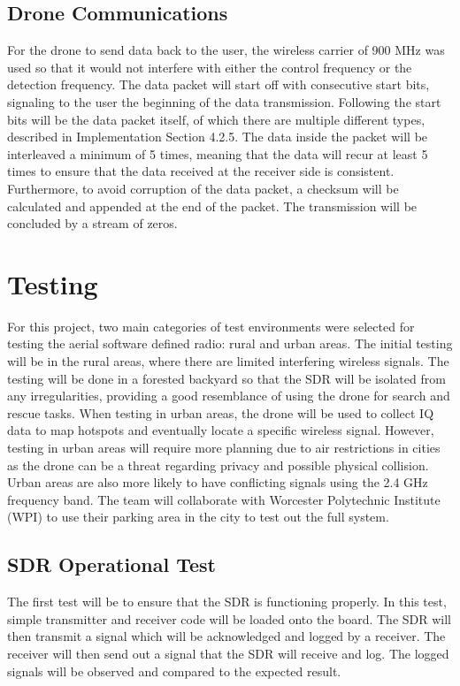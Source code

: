 \subsection{Drone Communications}
For the drone to send data back to the user, the wireless carrier of 900 MHz was used so that it would not interfere with either the control frequency or the detection frequency. The data packet will start off with consecutive start bits, signaling to the user the beginning of the data transmission. Following the start bits will be the data packet itself, of which there are multiple different types, described in Implementation Section 4.2.5. The data inside the packet will be interleaved a minimum of 5 times, meaning that the data will recur at least 5 times to ensure that the data received at the receiver side is consistent. Furthermore, to avoid corruption of the data packet, a checksum will be calculated and appended at the end of the packet. The transmission will be concluded by a stream of zeros. \par  

\section{Testing}
For this project, two main categories of test environments were selected for testing the aerial software defined radio: rural and urban areas. The initial testing will be in the rural areas, where there are limited interfering wireless signals. The testing will be done in a forested backyard so that the SDR will be isolated from any irregularities, providing a good resemblance of using the drone for search and rescue tasks. When testing in urban areas, the drone will be used to collect IQ data to map hotspots and eventually locate a specific wireless signal. However, testing in urban areas will require more planning due to air restrictions in cities as the drone can be a threat regarding privacy and possible physical collision. Urban areas are also more likely to have conflicting signals using the 2.4 GHz frequency band. The team will collaborate with Worcester Polytechnic Institute (WPI) to use their parking area in the city to test out the full system. \par
 
\subsection{SDR Operational Test}
The first test will be to ensure that the SDR is functioning properly. In this test, simple transmitter and receiver code will be loaded onto the board. The SDR will then transmit a signal which will be acknowledged and logged by a receiver. The receiver will then send out a signal that the SDR will receive and log. The logged signals will be observed and compared to the expected result. \par 

